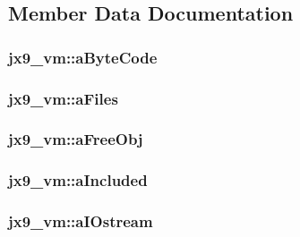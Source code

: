 \subsection{Member Data Documentation}
\hypertarget{structjx9__vm_a60d7e1d615b5dfdccd213b21b13fd4dc}{
\subsubsection[{a\-Byte\-Code}]{ jx9\-\_\-vm\-::a\-Byte\-Code}}\label{d1/d16/structjx9__vm_a60d7e1d615b5dfdccd213b21b13fd4dc}
\hypertarget{structjx9__vm_ad06a03f8cfd4577aedcf8a4572edbe25}{
\subsubsection[{a\-Files}]{ jx9\-\_\-vm\-::a\-Files}}\label{d1/d16/structjx9__vm_ad06a03f8cfd4577aedcf8a4572edbe25}
\hypertarget{structjx9__vm_a0515626acaf63e6a3b6db9a0f0212b28}{
\subsubsection[{a\-Free\-Obj}]{ jx9\-\_\-vm\-::a\-Free\-Obj}}\label{d1/d16/structjx9__vm_a0515626acaf63e6a3b6db9a0f0212b28}
\hypertarget{structjx9__vm_a5715c45b87d2a86df02ac197e5618dd7}{
\subsubsection[{a\-Included}]{ jx9\-\_\-vm\-::a\-Included}}\label{d1/d16/structjx9__vm_a5715c45b87d2a86df02ac197e5618dd7}
\hypertarget{structjx9__vm_af9f5593feb3207da87937add7b01a09c}{
\subsubsection[{a\-I\-Ostream}]{ jx9\-\_\-vm\-::a\-I\-Ostream}}\label{d1/d16/structjx9__vm_af9f5593feb3207da87937add7b01a09c}
